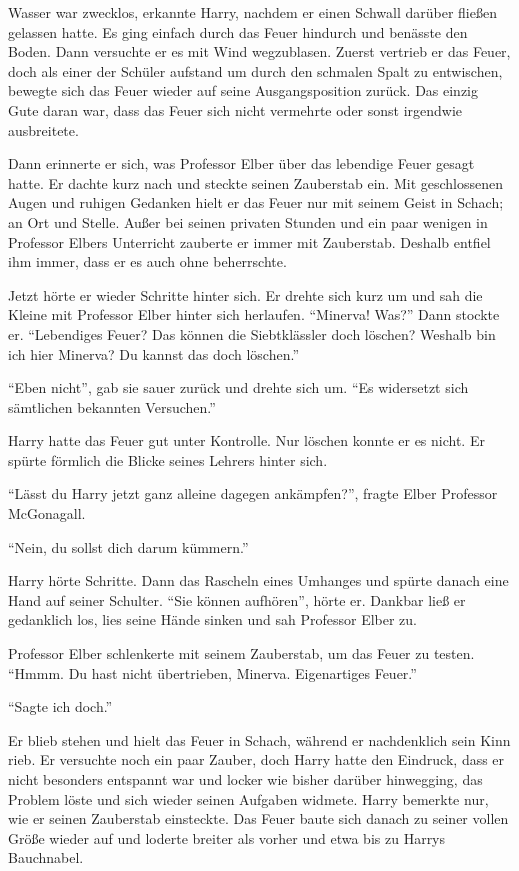 Wasser war zwecklos, erkannte Harry, nachdem er einen Schwall darüber fließen gelassen hatte. Es ging einfach durch das Feuer hindurch und benässte den Boden. Dann versuchte er es mit Wind wegzublasen. Zuerst vertrieb er das Feuer, doch als einer der Schüler aufstand um durch den schmalen Spalt zu entwischen, bewegte sich das Feuer wieder auf seine Ausgangsposition zurück. Das einzig Gute daran war, dass das Feuer sich nicht vermehrte oder sonst irgendwie ausbreitete.

Dann erinnerte er sich, was Professor Elber über das lebendige Feuer gesagt hatte. Er dachte kurz nach und steckte seinen Zauberstab ein. Mit geschlossenen Augen und ruhigen Gedanken hielt er das Feuer nur mit seinem Geist in Schach; an Ort und Stelle. Außer bei seinen privaten Stunden und ein paar wenigen in Professor Elbers Unterricht zauberte er immer mit Zauberstab. Deshalb entfiel ihm immer, dass er es auch ohne beherrschte.

Jetzt hörte er wieder Schritte hinter sich. Er drehte sich kurz um und sah die Kleine mit Professor Elber hinter sich herlaufen. \enquote{Minerva! Was?} Dann stockte er. \enquote{Lebendiges Feuer? Das können die Siebtklässler doch löschen? Weshalb bin ich hier Minerva? Du kannst das doch löschen.}

\enquote{Eben nicht}, gab sie sauer zurück und drehte sich um. \enquote{Es widersetzt sich sämtlichen bekannten Versuchen.}

Harry hatte das Feuer gut unter Kontrolle. Nur löschen konnte er es nicht. Er spürte förmlich die Blicke seines Lehrers hinter sich.

\enquote{Lässt du Harry jetzt ganz alleine dagegen ankämpfen?}, fragte Elber Professor McGonagall.

\enquote{Nein, du sollst dich darum kümmern.}

Harry hörte Schritte. Dann das Rascheln eines Umhanges und spürte danach eine Hand auf seiner Schulter. \enquote{Sie können aufhören}, hörte er. Dankbar ließ er gedanklich los, lies seine Hände sinken und sah Professor Elber zu.

Professor Elber schlenkerte mit seinem Zauberstab, um das Feuer zu testen. \enquote{Hmmm. \gst Du hast nicht übertrieben, Minerva. Eigenartiges Feuer.}

\enquote{Sagte ich doch.}

Er blieb stehen und hielt das Feuer in Schach, während er nachdenklich sein Kinn rieb. Er versuchte noch ein paar Zauber, doch Harry hatte den Eindruck, dass er nicht besonders entspannt war und locker wie bisher darüber hinwegging, das Problem löste und sich wieder seinen Aufgaben widmete. Harry bemerkte nur, wie er seinen Zauberstab einsteckte. Das Feuer baute sich danach zu seiner vollen Größe wieder auf und loderte breiter als vorher und etwa bis zu Harrys Bauchnabel.

